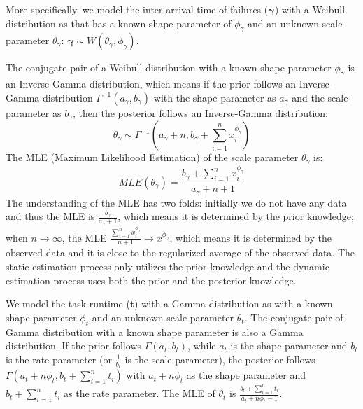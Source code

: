 \documentclass{IOS-Book-Article}
\begin{document}
More specifically, we model the inter-arrival time of failures ($\bm\gamma$) with a Weibull distribution as \cite{Schroeder2006} that has a known shape parameter of $\phi_{\gamma}$ and an unknown scale parameter $\theta_{\gamma}$: $\bm\gamma\sim W(\theta_{\gamma}, \phi_{\gamma})$. 

The conjugate pair of a Weibull distribution with a known shape parameter $\phi_{\gamma}$ is an Inverse-Gamma distribution, which means if the prior follows an Inverse-Gamma distribution $\Gamma^{-1}(a_{\gamma}, b_{\gamma})$ with the shape parameter as $a_{\gamma}$ and the scale parameter as $b_{\gamma}$, then the posterior follows an Inverse-Gamma distribution:
\begin{equation}
\theta_{\gamma}\sim\Gamma^{-1}(a_{\gamma}+n,\displaystyle b_{\gamma}+\sum_{i=1}^n{x_i^{\phi_{\gamma}}})
\label{eq:theta-1}
 \end{equation}
The MLE (Maximum Likelihood Estimation) of the scale parameter $\theta_{\gamma}$ is:
\begin{equation}
MLE(\theta_{\gamma})=\displaystyle\frac{b_{\gamma}+\displaystyle\sum_{i=1}^n{x_i^{\phi_{\gamma}}}}{a_{\gamma}+n+1}
\end{equation}
The understanding of the MLE has two folds: initially we do not have any data and thus the MLE is $\displaystyle\frac{b_{\gamma}}{a_{\gamma}+1}$, which means it is determined by the prior knowledge; when $n\to\infty$, the MLE $\displaystyle\frac{\displaystyle\sum_{i=1}^n{x_i^{\phi_{\gamma}}}}{n+1}\to\overline{x^{\phi_{\gamma}}}$, which means it is determined by the observed data and it is close to the regularized average of the observed data. The static estimation process only utilizes the prior knowledge and the dynamic estimation process uses both the prior and the posterior knowledge. 

We model the task runtime ($\bm t$) with a Gamma distribution as \cite{Sun2003, Iosup2008} with a known shape parameter $\phi_{t}$ and an unknown scale parameter $\theta_t$. The conjugate pair of Gamma distribution with a known shape parameter is also a Gamma distribution. If the prior follows $\Gamma(a_t, b_t)$, while $a_t$ is the shape parameter and $b_t$ is the rate parameter (or $\displaystyle \frac{1}{b_t}$ is the scale parameter), the posterior follows $\Gamma(a_t+n\phi_t, b_t+\displaystyle\sum_{i=1}^n{t_i})$ with $a_t+n\phi_t$ as the shape parameter and $b_t+\displaystyle\sum_{i=1}^n{t_i}$ as the rate parameter. The MLE of $\theta_t$ is $\displaystyle\frac{b_t+\displaystyle\sum_{i=1}^n{t_i}}{a_t+n\phi_t-1}$. 
\end{document}
